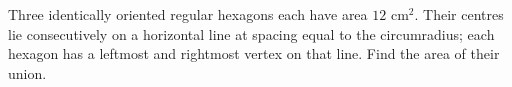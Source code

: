 Three identically oriented regular hexagons each have area $12\text{ cm}^2$. Their centres lie consecutively on a horizontal line at spacing equal to the circumradius; each hexagon has a leftmost and rightmost vertex on that line. Find the area of their union.
